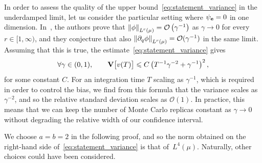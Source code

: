 \documentclass[11pt,a4paper]{article}
\begin{document}
\begin{remark}
    In order to assess the quality of the upper bound~\eqref{eq:statement_variance} in the underdamped limit,
    let us consider the particular setting where $\psi_{\boldsymbol{\mathbf e}} = 0$ in one dimension.
    In~\cite[Remark 6.10]{MR2394704},
    the authors prove that $\norm{\phi}[\lp{r}{\mu}] = \bigo{\gamma^{-1}}$ as $\gamma \to 0$ for every $r \in [1, \infty)$,
    and they conjecture that also $\norm{\partial_q \phi}[\lp{r}{\mu}] = \mathcal O(\gamma^{-1})$ in the same limit.
    Assuming that this is true, the estimate~\eqref{eq:statement_variance} gives
    \begin{equation}
        \label{eq:variance_scaling}
        \forall \gamma \in (0, 1), \qquad
        \mathbf{V} \bigl[v(T)\bigr]
        \leqslant C \left( T^{-1} \gamma^{-2} + \gamma^{-1} \right)^2,
    \end{equation}
    for some constant $C$.
    For an integration time $T$ scaling as $\gamma^{-1}$,
    which is required in order to control the bias,
    we find from this formula that the variance scales as $\gamma^{-2}$,
    and so the relative standard deviation scales as $\mathcal O(1)$.
    In practice, this means that we can keep the number of Monte Carlo replicas constant as $\gamma \to 0$
    without degrading the relative width of our confidence interval.
\end{remark}
\begin{remark}
    We choose $a = b = 2$ in the following proof,
    and so the norm obtained on the right-hand side of~\eqref{eq:statement_variance} is that of~$L^4(\mu)$.
    Naturally, other choices could have been considered.
\end{remark}
\end{document}
